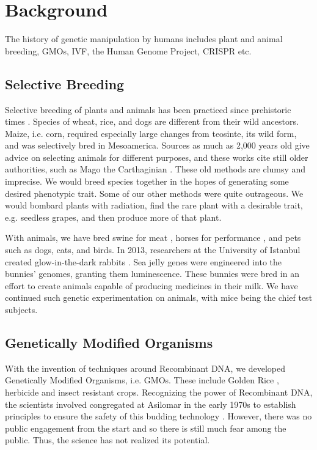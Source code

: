 \section{Background}
\label{sec:background}

The history of genetic manipulation by humans includes plant and animal breeding, GMOs, IVF, the Human Genome Project, CRISPR etc.

\subsection{Selective Breeding}

Selective breeding of plants and animals has been practiced since prehistoric times \cite{Buffum1909}.
Species of wheat, rice, and dogs are different from their wild ancestors.
Maize, i.e. corn, required especially large changes from teosinte, its wild form, and was selectively bred in Mesoamerica.
Sources as much as 2,000 years old give advice on selecting animals for different purposes, and these works cite still older authorities, such as Mago the Carthaginian \cite{Lush2017}.
These old methods are clumsy and imprecise.
We would breed species together in the hopes of generating some desired phenotypic trait.
Some of our other methods were quite outrageous.
We would bombard plants with radiation, find the rare plant with a desirable trait, e.g. seedless grapes, and then produce more of that plant.

With animals, we have bred swine for meat \cite{OSU2011}, horses for performance \cite{Evans2000}, and pets such as dogs, cats, and birds.
In 2013, researchers at the University of Istanbul created glow-in-the-dark rabbits \cite{Rojhan2013}.
Sea jelly genes were engineered into the bunnies' genomes, granting them luminescence.
These bunnies were bred in an effort to create animals capable of producing medicines in their milk.
We have continued such genetic experimentation on animals, with mice being the chief test subjects.

\subsection{Genetically Modified Organisms}

With the invention of techniques around Recombinant DNA, we developed Genetically Modified Organisms, i.e. GMOs.
These include Golden Rice \cite{Xudong2000}, herbicide \cite{Funke2006} and insect \cite{Paine2005} resistant crops.
Recognizing the power of Recombinant DNA, the scientists involved congregated at Asilomar in the early 1970s to establish principles to ensure the safety of this budding technology \cite{Berg1975}.
However, there was no public engagement from the start and so there is still much fear among the public.
Thus, the science has not realized its potential.

